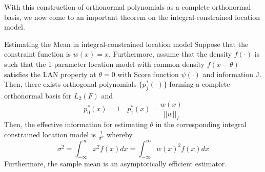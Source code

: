 \documentclass[twoside]{article}
\begin{document}
With this construction of orthonormal polynomials as a complete orthonormal basis, we now come to an important theorem on the integral-constrained location model.
\begin{proposition_exam}{Estimating the Mean in integral-constrained location model}{} Suppose that the constraint function is $w(x) = x$. Furthermore, assume that the density $f(\cdot)$ is such that the 1-parameter location model with common density $f(x - \theta)$ satisfies the LAN property at $\theta = 0$ with Score function $\psi(\cdot)$ and information J. Then, there exists orthogonal polynomials $\{p_{j}^{*}(\cdot)\}$ forming a complete orthonormal basis for $L_2(F)$ and 
$$
p_0^{*}(x) = 1 \quad p_{1}^{*}(x) = \frac{w(x)}{||w||_{f}}
$$
Then, the effective information for estimating $\theta$ in the corresponding integral constrained location model is $\frac{1}{\sigma^2}$ whereby 
\begin{equation}
  \sigma^2 = \int_{-\infty}^{\infty}x^2f(x)dx = \int_{-\infty}^{\infty}w(x)^2f(x)dx
\end{equation}
Furthermore, the sample mean is an asymptotically efficient estimator.
\end{proposition_exam}
\end{document}
